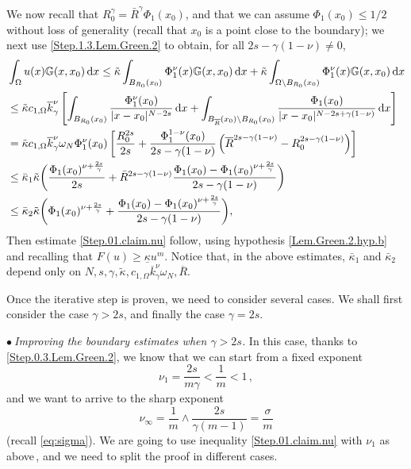 \documentclass[11pt]{article}
\numberwithin{equation}{section}
\newcommand{\dx}{\,{\rm d}x}
\newcommand{\n}{F}
\newcommand{\kb}{\underline{\kappa}}
\newcommand{\K}{{\mathbb G}}
\begin{document}
We now recall that $R_0^\gamma= \bar R^\gamma \Phi_1(x_0)$, and that we can assume $\Phi_1(x_0)\le 1/2$ without loss of generality (recall that $x_0$ is a point close to the boundary);   we next use \eqref{Step.1.3.Lem.Green.2} to obtain, for all $2s-\gamma(1-\nu)\neq 0$,
\begin{equation}\label{Step.1.4.Lem.Green.2}\begin{split}
&\int_{\Omega}  u(x)  \K(x,x_0)\dx
\le \tilde\kappa \int_{B_{R_0}(x_0)} \Phi_1^{\nu}(x)\K(x,x_0)\dx+\tilde\kappa \int_{\Omega\setminus B_{R_0}(x_0)} \Phi_1^{\nu}(x)\K(x,x_0)\dx\\
&\le \tilde\kappa c_{1,\Omega}\overline{k}_\gamma^{\nu}\left[\int_{B_{R_0}(x_0)} \frac{\Phi_1^{\nu}(x_0)}{|x-x_0|^{N-2s}} \dx + \int_{B_{\overline{R}}(x_0)\setminus B_{R_0}(x_0)} \dfrac{\Phi_1(x_0)}{|x-x_0|^{N-2s+\gamma(1-\nu)}}\dx\right]\\
&= \tilde\kappa c_{1,\Omega}\overline{k}_\gamma^{\nu}\omega_N\Phi_1^{\nu}(x_0)\left[\frac{R_0^{2s}}{2s}
            + \frac{\Phi_1^{1-\nu}(x_0)}{2s-\gamma(1-\nu)}\left(\overline{R}^{2s-\gamma(1-\nu)}-R_0^{2s-\gamma(1-\nu)}\right)\right]\\
&\leq \bar \kappa_1 \tilde\kappa \biggl(\frac{\Phi_1(x_0)^{\nu+\frac{2s}{\gamma}}}{2s}+ \bar R^{2s-\gamma(1-\nu)}\frac{\Phi_1(x_0) - \Phi_1(x_0)^{\nu+\frac{2s}{\gamma}}}{2s-\gamma(1-\nu)}\biggr)\\
&\leq \bar \kappa_2 \tilde\kappa\biggl(\Phi_1(x_0)^{\nu+\frac{2s}{\gamma}}+ \frac{\Phi_1(x_0) - \Phi_1(x_0)^{\nu+\frac{2s}{\gamma}}}{2s-\gamma(1-\nu)}\biggr),
\end{split}
\end{equation}
Then estimate \eqref{Step.01.claim.nu} follow, using hypothesis \eqref{Lem.Green.2.hyp.b} and recalling that $\n(u)\ge \kb u^m$.
Notice that, in the above estimates, $\bar\kappa_1$ and $\bar\kappa_2$ depend only on $N,s,\gamma,\tilde\kappa, c_{1,\Omega}\overline{k}_\gamma^{\nu}\omega_N,\overline{R}$.

\medskip

Once the iterative step is proven, we need to consider several cases. We shall first consider the case $\gamma>2s$, and finally the case $\gamma=2s$.


\noindent$\bullet~$\textit{Improving the boundary estimates when $\gamma>2s$. }In this case, thanks to \eqref{Step.0.3.Lem.Green.2}, we know that  we can start from a fixed exponent
\[
\nu_1=\frac{2s}{m\gamma}<\frac{1}{m}<1\,,%
\]
and we want to arrive to the sharp exponent
\[
\nu_\infty=\frac{1}{m}\wedge \frac{2s}{\gamma(m-1)}=\frac{\sigma}{m}
\]
(recall \eqref{eq:sigma}).
We are going to use inequality \eqref{Step.01.claim.nu} with $\nu_1$ as above\,, and we need to split the proof in different cases.
\end{document}
